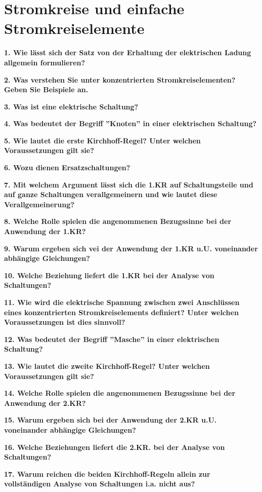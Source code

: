 \documentclass[12pt,a4paper,twoside]{book}
\newcommand{\nqu}[1]{\vspace*{10mm} \noindent \textbf{#1} \par \vspace*{1mm}}
\begin{document}

\chapter{Stromkreise und einfache Stromkreiselemente}


\nqu{1. Wie lässt sich der Satz von der Erhaltung der elektrischen Ladung allgemein formulieren?}

\nqu{2. Was verstehen Sie unter konzentrierten Stromkreiselementen? Geben Sie Beispiele an.}

\nqu{3. Was ist eine elektrische Schaltung?}

\nqu{4. Was bedeutet der Begriff ''Knoten'' in einer elektrischen Schaltung?}

\nqu{5. Wie lautet die erste Kirchhoff-Regel? Unter welchen Voraussetzungen gilt sie?}

\nqu{6. Wozu dienen Ersatzschaltungen?}

\nqu{7. Mit welchem Argument lässt sich die 1.KR auf Schaltungsteile und auf ganze Schaltungen verallgemeinern und wie lautet diese Verallgemeinerung?}

\nqu{8. Welche Rolle spielen die angenommenen Bezugssinne bei der Anwendung der 1.KR?}

\nqu{9. Warum ergeben sich vei der Anwendung der 1.KR u.U. voneinander abhängige Gleichungen?}

\nqu{10. Welche Beziehung liefert die 1.KR bei der Analyse von Schaltungen?}

\nqu{11. Wie wird die elektrische Spannung zwischen zwei Anschlüssen eines konzentrierten Stromkreiselements definiert? Unter welchen Voraussetzungen ist dies sinnvoll?}

\nqu{12. Was bedeutet der Begriff ''Masche'' in einer elektrischen Schaltung?}

\nqu{13. Wie lautet die zweite Kirchhoff-Regel? Unter welchen Voraussetzungen gilt sie?}

\nqu{14. Welche Rolle spielen die angenommenen Bezugssinne bei der Anwendung der 2.KR?}

\nqu{15. Warum ergeben sich bei der Anwendung der 2.KR u.U. voneinander abhängige Gleichungen?}

\nqu{16. Welche Beziehungen liefert die 2.KR. bei der Analyse von Schaltungen?}

\nqu{17. Warum reichen die beiden Kirchhoff-Regeln allein zur vollständigen Analyse von Schaltungen i.a. nicht aus?}
\end{document}
